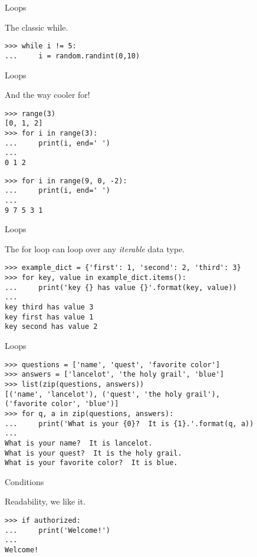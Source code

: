 \documentclass[ignorenonframetext,]{beamer}
\begin{document}
\begin{frame}[fragile]{Loops}

    The classic while.

    \begin{verbatim}
>>> while i != 5:
...     i = random.randint(0,10)
    \end{verbatim}
\end{frame}

\begin{frame}[fragile]{Loops}

    And the way cooler for!

    \begin{verbatim}
>>> range(3)
[0, 1, 2]
>>> for i in range(3):
...     print(i, end=' ')
...
0 1 2
    \end{verbatim}

    \pause
    \begin{verbatim}
>>> for i in range(9, 0, -2):
...     print(i, end=' ')
...
9 7 5 3 1
    \end{verbatim}
\end{frame}

\begin{frame}[fragile]{Loops}

    The for loop can loop over any \emph{iterable} data type.

    \begin{verbatim}
>>> example_dict = {'first': 1, 'second': 2, 'third': 3}
>>> for key, value in example_dict.items():
...     print('key {} has value {}'.format(key, value))
...
key third has value 3
key first has value 1
key second has value 2
    \end{verbatim}
\end{frame}

\begin{frame}[fragile]{Loops}
    \begin{verbatim}
>>> questions = ['name', 'quest', 'favorite color']
>>> answers = ['lancelot', 'the holy grail', 'blue']
>>> list(zip(questions, answers))
[('name', 'lancelot'), ('quest', 'the holy grail'),
('favorite color', 'blue')]
>>> for q, a in zip(questions, answers):
...     print('What is your {0}?  It is {1}.'.format(q, a))
...
What is your name?  It is lancelot.
What is your quest?  It is the holy grail.
What is your favorite color?  It is blue.
    \end{verbatim}
\end{frame}

\begin{frame}[fragile]{Conditions}

    Readability, we like it.

    \begin{verbatim}
>>> if authorized:
...     print('Welcome!')
...
Welcome!
    \end{verbatim}
\end{frame}
\end{document}
